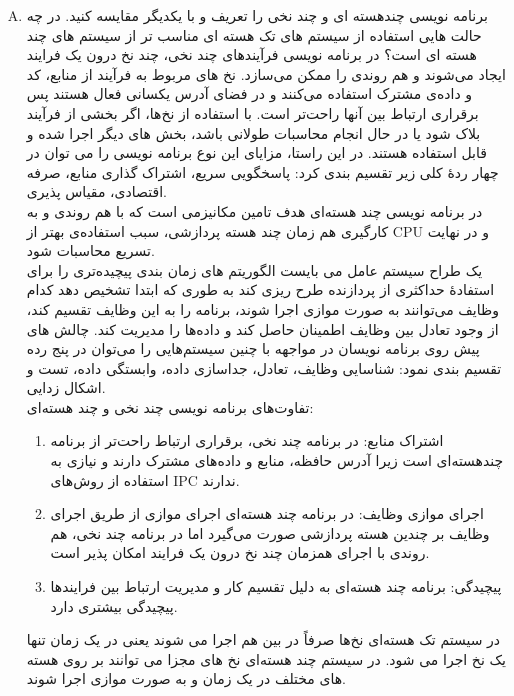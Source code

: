 \documentclass[]{article}
\begin{document}
\begin{enumerate}[(A)]
    \item {ﺑﺮﻧﺎﻣﻪ ﻧﻮﯾﺴﯽ ﭼﻨﺪﻫﺴﺘﻪ ﺍﯼ ﻭ ﭼﻨﺪ ﻧﺨﯽ ﺭﺍ ﺗﻌﺮﯾﻒ ﻭ ﺑﺎ ﯾﮑﺪﯾﮕﺮ ﻣﻘﺎﯾﺴﻪ ﮐﻨﯿﺪ.
          ﺩﺭ ﭼﻪ ﺣﺎﻟﺖ ﻫﺎﯾﯽ ﺍﺳﺘﻔﺎﺩﻩ ﺍﺯ ﺳﯿﺴﺘﻢ ﻫﺎﯼ ﺗﮏ ﻫﺴﺘﻪ ﺍﯼ ﻣﻨﺎﺳﺐ ﺗﺮ ﺍﺯ ﺳﯿﺴﺘﻢ ﻫﺎﯼ ﭼﻨﺪ ﻫﺴﺘﻪ ﺍﯼ ﺍﺳﺖ؟}
          در برنامه نویسی فرآیندهای چند نخی، چند نخ درون یک فرایند ایجاد می‌شوند و هم روندی را ممکن می‌سازد.
          نخ های مربوط به فرآیند از منابع، کد و داده‌ی مشترک استفاده می‌کنند و در فضای آدرس یکسانی فعال هستند پس برقراری ارتباط بین آنها راحت‌تر است.
          با استفاده از نخ‌ها، اگر بخشی از فرآیند بلاک شود یا در حال انجام محاسبات طولانی باشد، بخش های دیگر اجرا شده و قابل استفاده هستند.
          در این راستا، مزایای این نوع برنامه نویسی را می توان در چهار ردۀ کلی زیر تقسیم بندی کرد:  پاسخگویی سریع، اشتراک گذاری منابع، صرفه اقتصادی، مقیاس پذیری.
          \\
          در برنامه نویسی چند هسته‌ای هدف تامین مکانیزمی است که با هم روندی و به کارگیری هم زمان چند هسته پردازشی، سبب استفاده‌ی بهتر از CPU و در نهایت تسریع محاسبات شود.
          \\
          یک طراح سیستم عامل می بایست الگوریتم های زمان بندی پیچیده‌تری را برای استفادۀ حداکثری از پردازنده طرح ریزی کند
          به طوری که ابتدا تشخیص دهد کدام وظایف می‌توانند به صورت موازی اجرا شوند، برنامه را به این وظایف تقسیم کند،
          از وجود تعادل بین وظایف اطمینان حاصل کند و داده‌ها را مدیریت کند.
          چالش های پیش روی برنامه نویسان در مواجهه با چنین سیستم‌هایی را می‌توان در پنج رده تقسیم بندی نمود: شناسایی وظایف، تعادل، جداسازی داده، وابستگی داده، تست و اشکال زدایی.
          \\
          تفاوت‌های برنامه‌ نویسی چند نخی و چند هسته‌ای:
          \begin{enumerate}[1.]
              \item اشتراک منابع: در برنامه چند نخی، برقراری ارتباط راحت‌تر از برنامه چندهسته‌ای است
                    زیرا آدرس حافظه، منابع و داده‌های مشترک دارند و نیازی به استفاده از روش‌های IPC ندارند.
              \item اجرای موازی وظایف: در برنامه چند هسته‌ای اجرای موازی از طریق اجرای وظایف بر چندین هسته پردازشی صورت می‌گیرد
                    اما در برنامه چند نخی، هم روندی با اجرای همزمان چند نخ درون یک فرایند امکان پذیر است.
              \item پیچیدگی: برنامه چند هسته‌ای به دلیل تقسیم کار و مدیریت ارتباط بین فرایندها پیچیدگی بیشتری دارد.
          \end{enumerate}
          در سیستم تک هسته‌ای نخ‌ها صرفاً در بین هم اجرا می شوند یعنی در یک زمان تنها یک نخ اجرا می شود.
          در سیستم چند هسته‌ای نخ های مجزا می توانند بر روی هسته های مختلف در یک زمان و به صورت موازی اجرا شوند.

\end{enumerate}
\end{document}
